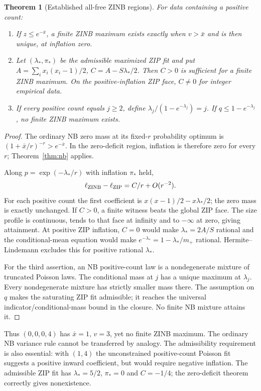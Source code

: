 \documentclass[12pt]{article}
\newtheorem{theorem}{Theorem}[section]
\theoremstyle{definition}
\theoremstyle{remark}
\begin{document}
\begin{theorem}[Established all-free ZINB regions]\label{thm:zinb}
For data containing a positive count:
\begin{enumerate}
\item If $z\le e^{-\bar x}$, a finite ZINB maximum exists exactly when
$v>\bar x$ and is then unique, at inflation zero.
\item Let $(\lambda_*,\pi_*)$ be the admissible maximized ZIP fit and put
$A=\sum_i x_i(x_i-1)/2$, $C=A-S\lambda_*/2$. Then $C>0$ is sufficient
for a finite ZINB maximum. On the positive-inflation ZIP face, $C\ne0$
for integer empirical data.
\item If every positive count equals $j\ge2$, define
$\lambda_j/(1-e^{-\lambda_j})=j$. If $q\le1-e^{-\lambda_j}$,
no finite ZINB maximum exists.
\end{enumerate}
\end{theorem}
\begin{proof}
The ordinary NB zero mass at its fixed-$r$ probability optimum is
$(1+\bar x/r)^{-r}>e^{-\bar x}$. In the zero-deficit region, inflation is
therefore zero for every $r$; Theorem~\ref{thm:nb} applies.

Along $p=\exp(-\lambda_*/r)$ with inflation $\pi_*$ held,
\begin{equation}\label{eq:zipgain}
 \ell_{\rm ZINB}-\ell_{\rm ZIP}=C/r+O(r^{-2}).
\end{equation}
For each positive count the first coefficient is
$x(x-1)/2-x\lambda_*/2$; the zero mass is exactly unchanged.
If $C>0$, a finite witness beats the global ZIP face. The size profile is
continuous, tends to that face at infinity and to $-\infty$ at zero, giving
attainment. At positive ZIP inflation, $C=0$ would make
$\lambda_*=2A/S$ rational and the conditional-mean equation would make
$e^{-\lambda_*}=1-\lambda_*/m_+$ rational. Hermite--Lindemann excludes
this for positive rational $\lambda_*$.

For the third assertion, an NB positive-count law is a nondegenerate
mixture of truncated Poisson laws. The conditional mass at $j$ has a
unique maximum at $\lambda_j$. Every nondegenerate mixture has strictly
smaller mass there. The assumption on $q$ makes the saturating ZIP fit
admissible; it reaches the universal indicator/conditional-mass bound in
the closure. No finite NB mixture attains it.
\end{proof}
Thus $(0,0,0,4)$ has $\bar x=1$, $v=3$, yet no finite ZINB maximum. The
ordinary NB variance rule cannot be transferred by analogy. The
admissibility requirement is also essential: with $(1,4)$ the unconstrained
positive-count Poisson fit suggests a positive inward coefficient, but
would require negative inflation. The admissible ZIP fit has
$\lambda_*=5/2$, $\pi_*=0$ and $C=-1/4$; the zero-deficit theorem correctly
gives nonexistence.
\end{document}
